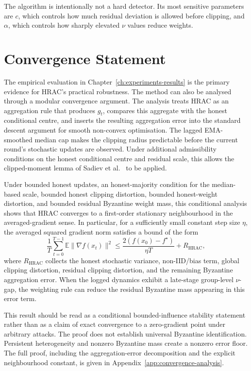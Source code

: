 The algorithm is intentionally not a hard detector. Its most sensitive
parameters are $c$, which controls how much residual deviation is allowed before
clipping, and $\alpha$, which controls how sharply elevated $\nu$ values reduce
weights.

\section{Convergence Statement}
\label{sec:convergence-statement}

The empirical evaluation in Chapter~\ref{ch:experiments-results} is the primary
evidence for HRAC's practical robustness. The method can also be analysed
through a modular convergence argument. The analysis treats HRAC as an
aggregation rule that produces \(g_t\), compares this aggregate with the honest
conditional centre, and inserts the resulting aggregation error into the
standard descent argument for smooth non-convex optimisation. The lagged
EMA-smoothed median cap makes the clipping radius predictable before the current
round's stochastic updates are observed. Under additional admissibility
conditions on the honest conditional centre and residual scale, this allows the
clipped-moment lemma of Sadiev et
al.~\cite[Lemma~5.1]{sadiev2023highprob} to be applied.

Under bounded honest updates, an honest-majority condition for the median-based
scale, bounded honest clipping distortion, bounded honest-weight distortion, and
bounded residual Byzantine weight mass, this conditional analysis shows that
HRAC converges to a first-order stationary neighbourhood in the averaged-gradient
sense. In
particular, for a sufficiently small constant step size \(\eta\), the averaged
squared gradient norm satisfies a bound of the form
\begin{equation}
    \frac{1}{T}\sum_{t=0}^{T-1}\mathbb{E}\|\nabla f(x_t)\|^2
    \le
    \frac{2(f(x_0)-f^\star)}{\eta T}
    +
    R_{\mathrm{HRAC}},
\end{equation}
where \(R_{\mathrm{HRAC}}\) collects the honest stochastic variance,
non-IID/bias term, global clipping distortion, residual clipping distortion,
and the remaining Byzantine aggregation error. When the logged dynamics exhibit
a late-stage group-level \(\nu\)-gap, the weighting rule can reduce the
residual Byzantine mass appearing in this error term.

This result should be read as a conditional bounded-influence stability
statement rather than as a claim of exact convergence to a zero-gradient point
under arbitrary attacks. The proof does not establish universal Byzantine
identification. Persistent heterogeneity and nonzero Byzantine mass create a
nonzero error floor. The full proof, including the aggregation-error
decomposition and the explicit neighbourhood constant, is given in
Appendix~\ref{app:convergence-analysis}.
